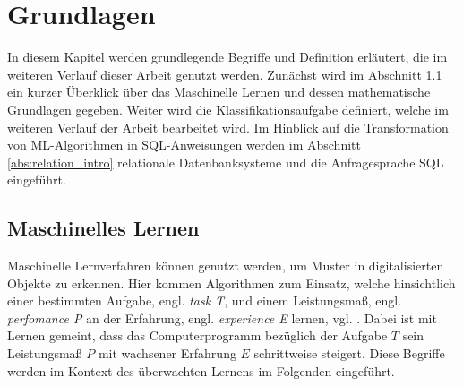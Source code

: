\chapter{Grundlagen}
\label{kap:fund}
In diesem Kapitel werden grundlegende Begriffe und Definition erläutert, die im weiteren Verlauf dieser Arbeit genutzt werden. Zunächst wird im Abschnitt \ref{abs:mathe_intro} ein kurzer Überklick über das Maschinelle Lernen und dessen mathematische Grundlagen gegeben. Weiter wird die Klassifikationsaufgabe definiert, welche im weiteren Verlauf der Arbeit bearbeitet wird. Im Hinblick auf die Transformation von ML-Algorithmen in SQL-Anweisungen werden im Abschnitt \ref{abs:relation_intro} relationale Datenbanksysteme und die Anfragesprache SQL eingeführt.
\section{Maschinelles Lernen}
\label{abs:mathe_intro}
Maschinelle Lernverfahren können genutzt werden, um Muster in digitalisierten Objekte zu erkennen. Hier kommen Algorithmen zum Einsatz, welche hinsichtlich einer bestimmten Aufgabe, engl. \textit{task T}, und einem Leistungsmaß, engl. \textit{perfomance P} an der Erfahrung, engl. \textit{experience E} lernen, vgl. \cite{Goodfellow-et-al-2016}. Dabei ist mit Lernen gemeint, dass das Computerprogramm bezüglich der Aufgabe $T$ sein
Leistungsmaß $P$ mit wachsener Erfahrung $E$ schrittweise steigert. Diese Begriffe werden im Kontext des überwachten Lernens im Folgenden eingeführt.

